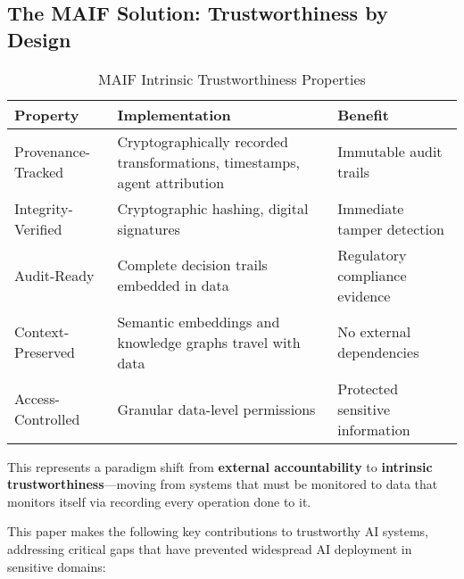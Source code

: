 \documentclass[conference]{IEEEtran}
\begin{document}
\subsection{The MAIF Solution: Trustworthiness by Design}

\begin{table*}[!t]
\renewcommand{\arraystretch}{1.3}
\caption{MAIF Intrinsic Trustworthiness Properties}
\label{tab:maif-trustworthiness}
\centering
\footnotesize
\begin{tabular}{p{3cm}p{6cm}p{5cm}}
\toprule
\textbf{Property} & \textbf{Implementation} & \textbf{Benefit} \\
\midrule
Provenance-Tracked & Cryptographically recorded transformations, timestamps, agent attribution & Immutable audit trails \\
Integrity-Verified & Cryptographic hashing, digital signatures & Immediate tamper detection \\
Audit-Ready & Complete decision trails embedded in data & Regulatory compliance evidence \\
Context-Preserved & Semantic embeddings and knowledge graphs travel with data & No external dependencies \\
Access-Controlled & Granular data-level permissions & Protected sensitive information \\
\bottomrule
\end{tabular}
\end{table*}

This represents a paradigm shift from \textbf{external accountability} to \textbf{intrinsic trustworthiness}—moving from systems that must be monitored to data that monitors itself via recording every operation done to it.


This paper makes the following key contributions to trustworthy AI systems, addressing critical gaps that have prevented widespread AI deployment in sensitive domains:
\end{document}
